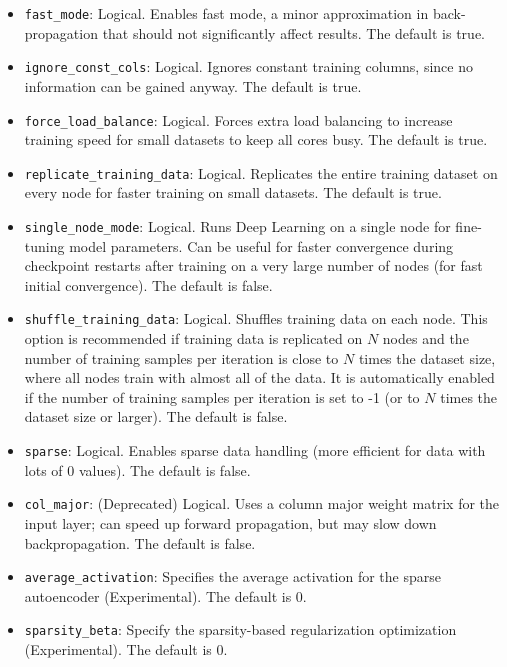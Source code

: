 {{{\begin{itemize}
\item \texttt{fast\_mode}: Logical. Enables fast mode, a minor approximation in back-propagation that should not significantly affect results. The default is true.

\item \texttt{ignore\_const\_cols}: Logical. Ignores constant training columns, since no information can be gained anyway.  The default is true.

\item \texttt{force\_load\_balance}:  Logical. Forces extra load balancing to increase training speed for small datasets to keep all cores busy. The default is true.

\item \texttt{replicate\_training\_data}:  Logical. Replicates the entire training dataset on every node for faster training on small datasets. The default is true.

\item \texttt{single\_node\_mode}:  Logical. Runs Deep Learning on a single node for fine-tuning model parameters. Can be useful for faster convergence during checkpoint restarts after training on a very large number of nodes (for fast initial convergence). The default is false.

\item \texttt{shuffle\_training\_data}: Logical. Shuffles training data on each node. This option is recommended if training data is replicated on $N$ nodes and the number of training samples per iteration is close to $N$ times the dataset size, where all nodes train with almost all of the data. It is automatically enabled if the number of training samples per iteration is set to -1 (or to $N$ times the dataset size or larger).  The default is false.

\item \texttt{sparse}: Logical. Enables sparse data handling (more efficient for data with lots of 0 values).
The default is false.

\item \texttt{col\_major}: (Deprecated) Logical. Uses a column major weight matrix for the input layer; can speed up forward propagation, but may slow down backpropagation. The default is false.

\item \texttt{average\_activation}: Specifies the average activation for the sparse autoencoder (Experimental).
The default is 0.

\item \texttt{sparsity\_beta}: Specify the sparsity-based regularization optimization (Experimental).  The default is 0. 


\end{itemize}}}}
